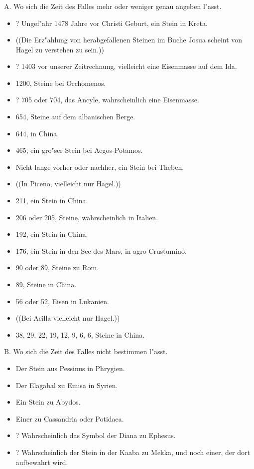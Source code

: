 \documentclass[a4paper, 11pt, oneside, polutonikogreek, german]{article}
\begin{document}
\subsubsection*{}
\begin{center}
A. Wo sich die Zeit des Falles mehr oder weniger genau angeben l"asst. 
\end{center}
\begin{itemize}
    \item ? Ungef"ahr 1478 Jahre vor Christi Geburt, ein Stein in Kreta.
    \item ((Die Erz"ahlung von herabgefallenen Steinen im Buche Josua scheint von Hagel zu verstehen zu sein.))
    \item ? 1403 vor unserer Zeitrechnung, vielleicht eine Eisenmasse auf dem Ida.
    \item 1200, Steine bei Orchomenos.
    \item ? 705 oder 704, das Ancyle, wahrscheinlich eine Eisenmasse.
    \item 654, Steine auf dem albanischen Berge.
    \item 644, in China.
    \item 465, ein gro"ser Stein bei Aegos-Potamos.
    \item Nicht lange vorher oder nachher, ein Stein bei Theben.
    \item ((In Piceno, vielleicht nur Hagel.))
    \item 211, ein Stein in China.
    \item 206 oder 205, Steine, wahrscheinlich in Italien.
    \item 192, ein Stein in China.
    \item 176, ein Stein in den See des Mars, in agro Crustumino.
    \item 90 oder 89, Steine zu Rom.
    \item 89, Steine in China.
    \item 56 oder 52, Eisen in Lukanien.
    \item ((Bei Acilla vielleicht nur Hagel.))
    \item 38, 29, 22, 19, 12, 9, 6, 6, Steine in China.
\end{itemize}
\begin{center}
B. Wo sich die Zeit des Falles nicht bestimmen l"asst.
\end{center}
\begin{itemize}
    \item Der Stein aus Pessinus in Phrygien.
    \item Der Elagabal zu Emisa in Syrien.
    \item Ein Stein zu Abydos.
    \item Einer zu Cassandria oder Potidaea.
    \item ? Wahrscheinlich das Symbol der Diana zu Ephesus.
    \item ? Wahrscheinlich der Stein in der Kaaba zu Mekka, und noch einer, der dort aufbewahrt wird.
\end{itemize}
\end{document}
